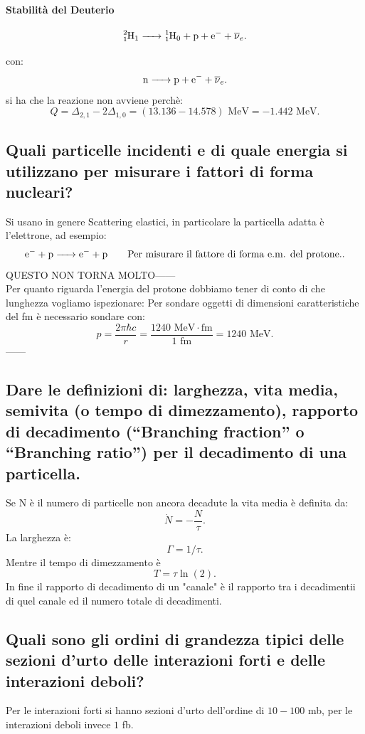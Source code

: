 \paragraph{Stabilità del Deuterio}
\[
	\ce{\ce{^{2}_{1}H_{1}} -> \ce{^{1}_{1}H_{0}} + p + e- + \overline{\nu}_e }
.\] 

con:
\[
	\ce{n -> p + e- + \overline{\nu}_e}
.\] 
si ha che la reazione non avviene perchè: 
\[
	Q = \Delta_{2,1} - 2\Delta_{1,0} = (13.136 -14.578)\text{ MeV} = -1.442 \text{ MeV} 
.\] 

\subsection[]{ Quali particelle incidenti e di quale energia si utilizzano per misurare i fattori di forma nucleari?}
Si usano in genere Scattering elastici, in particolare la particella adatta è l'elettrone, ad esempio:  
\[
\ce{e- + p  -> e- + p} \quad \quad \text{Per misurare il fattore di forma e.m. del protone.}
.\]  
QUESTO NON TORNA MOLTO------\\
Per quanto riguarda l'energia del protone dobbiamo tener di conto di che lunghezza vogliamo ispezionare: Per sondare oggetti di dimensioni caratteristiche del fm è necessario sondare con:
\[
	p = \frac{2\pi \hbar c }{r} =  \frac{1240 \text{ MeV} \cdot \text{fm}}{1 \text{ fm}} = 1240 \text{ MeV}
.\]
------

\subsection[]{ Dare le definizioni di: larghezza, vita media, semivita (o tempo di dimezzamento), rapporto di decadimento (“Branching fraction” o “Branching ratio”) per il decadimento di una particella.}
Se N è il numero di particelle non ancora decadute la vita media è definita da:
\[
	\dot{N} = -\frac{N}{\tau}
.\] 
La larghezza è:
\[
	\Gamma = 1/\tau
.\] 
Mentre il tempo di dimezzamento è
\[
	T = \tau \ln\left( 2 \right)  
.\] 
In fine il rapporto di decadimento di un "canale" è il rapporto tra i decadimentii di quel canale ed il numero totale di decadimenti.

\subsection[]{  Quali sono gli ordini di grandezza tipici delle sezioni d’urto delle interazioni forti e delle interazioni deboli?}
Per le interazioni forti si hanno sezioni d'urto dell'ordine di $10 - 100$ mb, per le interazioni deboli invece $1$ fb.

